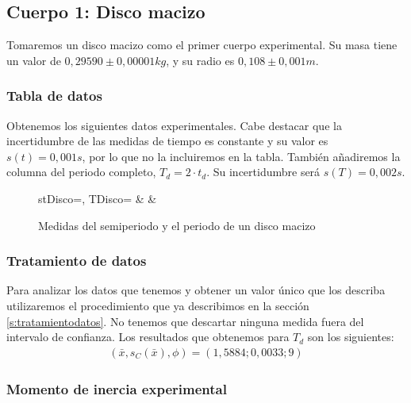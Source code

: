 \documentclass[12pt, a4paper, titlepage]{article}
\begin{document}
  \subsection{Cuerpo 1: Disco macizo}

  Tomaremos un disco macizo como el primer cuerpo experimental. Su masa tiene un valor de $0,29590 \pm 0,00001 kg$, y su radio es $0,108 \pm 0,001 m$.

  \subsubsection{Tabla de datos}

  Obtenemos los siguientes datos experimentales. Cabe destacar que la incertidumbre de las medidas de tiempo es constante y su valor es $s(t) = 0,001 s$, por lo que no la incluiremos en la tabla. También añadiremos la columna del periodo completo, $T_d = 2 \cdot t_d$. Su incertidumbre será $s(T) = 0,002 s$.

  \begin{figure}[H]
    \begin{table}[H]
      \centering
        {stDisco=\semiperiodo, TDisco=\periodo}
        {\thecsvrow & \semiperiodo & \periodo}
    \end{table}
    \caption{Medidas del semiperiodo y el periodo de un disco macizo}
  \end{figure}

  \subsubsection{Tratamiento de datos}

  Para analizar los datos que tenemos y obtener un valor único que los describa utilizaremos el procedimiento que ya describimos en la sección \ref{s:tratamientodatos}. No tenemos que descartar ninguna medida fuera del intervalo de confianza. Los resultados que obtenemos para $T_d$ son los siguientes:
  \begin{gather*}
    (\bar{x}, s_C(\bar{x}), \phi) = (1,5884;0,0033;9)
  \end{gather*}

  \subsubsection{Momento de inercia experimental}
\end{document}
